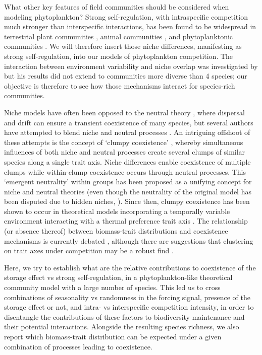 \documentclass[a4paper,12pt]{article}
\begin{document}
What other key features of field communities should be considered
when modeling phytoplankton? Strong self-regulation, with intraspecific
competition much stronger than interspecific interactions, has been
found to be widespread in terrestrial plant communities \citep{adler_competition_2018},
animal communities \citep{mutshinda_what_2009}, and phytoplanktonic
communities \citep{barraquand2018coastal}. We will therefore insert
those niche differences, manifesting as strong self-regulation, into
our models of phytoplankton competition. The interaction between environment
variability and niche overlap was investigated by \citet{abrams_niche_1976}
but his results did not extend to communities more diverse than 4
species; our objective is therefore to see how those mechanisms interact
for species-rich communities.

Niche models have often been opposed to the neutral theory \citep{hubbell_unified_2001},
where dispersal and drift can ensure a transient coexistence of many
species, but several authors have attempted to blend niche and neutral
processes \citep{gravel_reconciling_2006,scheffer_self-organized_2006,carmel_using_2017}.
An intriguing offshoot of these attempts is the concept of `clumpy
coexistence' \citep{scheffer_self-organized_2006}, whereby simultaneous
influences of both niche and neutral processes create several clumps
of similar species along a single trait axis. Niche differences enable
coexistence of multiple clumps \citep{chesson_mechanisms_2000} while
within-clump coexistence occurs through neutral processes. This `emergent
neutrality' within groups \citep{holt_emergent_2006} has been proposed
as a unifying concept for niche and neutral theories (even though
the neutrality of the original model has been disputed due to hidden
niches, \citealp{barabas_emergent_2013}). Since then, clumpy coexistence
has been shown to occur in theoretical models incorporating a temporally
variable environment interacting with a thermal preference trait axis
\citep{scranton_coexistence_2016,sakavara_lumpy_2018}. The relationship
(or absence thereof) between biomass-trait distributions and coexistence
mechanisms is currently debated \citep{dandrea_challenges_2016},
although there are suggestions that clustering on trait axes under
competition may be a robust find \citep{dandrea_translucent_2018,dandrea_generalizing_2019}.

Here, we try to establish what are the relative contributions to coexistence
of the storage effect vs strong self-regulation, in a phytoplankton-like
theoretical community model with a large number of species. This led
us to cross combinations of seasonality vs randomness in the forcing
signal, presence of the storage effect or not, and intra- vs interspecific
competition intensity, in order to disentangle the contributions of
these factors to biodiversity maintenance and their potential interactions.
Alongside the resulting species richness, we also report which biomass-trait
distribution can be expected under a given combination of processes
leading to coexistence.
\end{document}
